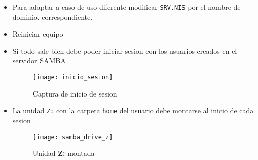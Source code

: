 \documentclass[../main.tex]{subfiles}
\begin{document}
\begin{itemize}
  \item Para adaptar a caso de uso diferente
        modificar \texttt{SRV.NIS} por el nombre de dominio.
        correspondiente.
  \item Reiniciar equipo
        \newpage{}
  \item Si todo sale bien debe poder iniciar sesion con los
        usuarios creados en el servidor \Gls{SAMBA}
        \begin{figure}[H]
          \centering
          \texttt{[image: inicio\_sesion]}
          \caption{Captura de inicio de sesion}\label{fig:inicio_sesion}
        \end{figure}
        \newpage{}
  \item La unidad \texttt{Z:} con la carpeta \texttt{home} del usuario debe
        montarse al inicio de cada sesion
        \begin{figure}[H]
          \centering
          \texttt{[image: samba\_drive\_z]}
          \caption{Unidad \textbf{Z:} montada}\label{fig:samba_drive_z}
        \end{figure}

\end{itemize}
\end{document}
